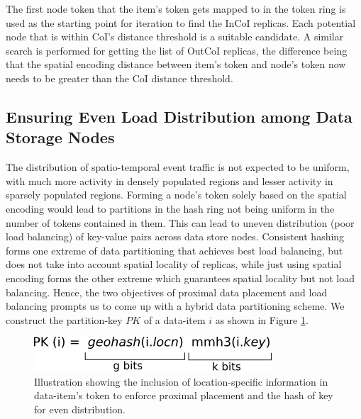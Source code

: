 The first node token that the item's token gets mapped to in the token ring is used as the starting point for iteration to find the InCoI replicas. Each potential node that is within CoI's distance threshold is a suitable candidate. A similar search is performed for getting the list of OutCoI replicas, the difference being that the spatial encoding distance between item's token and node's token now needs to be greater than the CoI distance threshold.

\subsection{Ensuring Even Load Distribution among Data Storage Nodes}
\par The distribution of spatio-temporal event traffic is not expected to be uniform, with much more activity in densely populated regions and lesser activity in sparsely populated regions. Forming a node's token solely based on the spatial encoding would lead to partitions in the hash ring not being uniform in the number of tokens contained in them. This can lead to uneven distribution (poor load balancing) of key-value pairs across data store nodes. Consistent hashing forms one extreme of data partitioning that achieves best load balancing, but does not take into account spatial locality of replicas, while just using spatial encoding forms the other extreme which guarantees spatial locality but not load balancing.
Hence, the two objectives of proximal data placement and load balancing prompts us to come up with a hybrid data partitioning scheme. We construct the partition-key $PK$ of a data-item $i$ as shown in Figure \ref{fig:partitionkey}.
\begin{figure}[h]
\centering
\includegraphics[width=0.75\columnwidth]{figures/fogstore/partitionkey.png}
\caption{Illustration showing the inclusion of location-specific information in data-item's token to enforce proximal placement and the hash of key for even distribution.}
\label{fig:partitionkey}
\end{figure}

